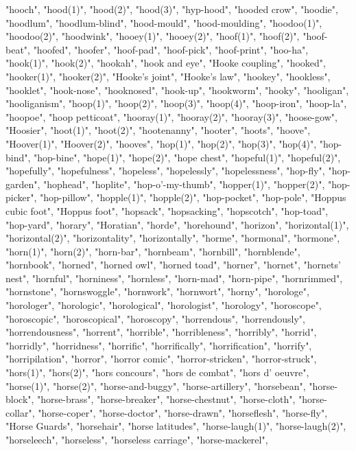 "hooch",
"hood(1)",
"hood(2)",
"hood(3)",
"hyp-hood",
"hooded crow",
"hoodie",
"hoodlum",
"hoodlum-blind",
"hood-mould",
"hood-moulding",
"hoodoo(1)",
"hoodoo(2)",
"hoodwink",
"hooey(1)",
"hooey(2)",
"hoof(1)",
"hoof(2)",
"hoof-beat",
"hoofed",
"hoofer",
"hoof-pad",
"hoof-pick",
"hoof-print",
"hoo-ha",
"hook(1)",
"hook(2)",
"hookah",
"hook and eye",
"Hooke coupling",
"hooked",
"hooker(1)",
"hooker(2)",
"Hooke's joint",
"Hooke's law",
"hookey",
"hookless",
"hooklet",
"hook-nose",
"hooknosed",
"hook-up",
"hookworm",
"hooky",
"hooligan",
"hooliganism",
"hoop(1)",
"hoop(2)",
"hoop(3)",
"hoop(4)",
"hoop-iron",
"hoop-la",
"hoopoe",
"hoop petticoat",
"hooray(1)",
"hooray(2)",
"hooray(3)",
"hoose-gow",
"Hoosier",
"hoot(1)",
"hoot(2)",
"hootenanny",
"hooter",
"hoots",
"hoove",
"Hoover(1)",
"Hoover(2)",
"hooves",
"hop(1)",
"hop(2)",
"hop(3)",
"hop(4)",
"hop-bind",
"hop-bine",
"hope(1)",
"hope(2)",
"hope chest",
"hopeful(1)",
"hopeful(2)",
"hopefully",
"hopefulness",
"hopeless",
"hopelessly",
"hopelessness",
"hop-fly",
"hop-garden",
"hophead",
"hoplite",
"hop-o'-my-thumb",
"hopper(1)",
"hopper(2)",
"hop-picker",
"hop-pillow",
"hopple(1)",
"hopple(2)",
"hop-pocket",
"hop-pole",
"Hoppus cubic foot",
"Hoppus foot",
"hopsack",
"hopsacking",
"hopscotch",
"hop-toad",
"hop-yard",
"horary",
"Horatian",
"horde",
"horehound",
"horizon",
"horizontal(1)",
"horizontal(2)",
"horizontality",
"horizontally",
"horme",
"hormonal",
"hormone",
"horn(1)",
"horn(2)",
"horn-bar",
"hornbeam",
"hornbill",
"hornblende",
"hornbook",
"horned",
"horned owl",
"horned toad",
"horner",
"hornet",
"hornets' nest",
"hornful",
"horniness",
"hornless",
"horn-mad",
"horn-pipe",
"hornrimmed",
"hornstone",
"hornswoggle",
"hornwork",
"hornwort",
"horny",
"horologe",
"horologer",
"horologic",
"horological",
"horologist",
"horology",
"horoscope",
"horoscopic",
"horoscopical",
"horoscopy",
"horrendous",
"horrendously",
"horrendousness",
"horrent",
"horrible",
"horribleness",
"horribly",
"horrid",
"horridly",
"horridness",
"horrific",
"horrifically",
"horrification",
"horrify",
"horripilation",
"horror",
"horror comic",
"horror-stricken",
"horror-struck",
"hors(1)",
"hors(2)",
"hors concours",
"hors de combat",
"hors d' oeuvre",
"horse(1)",
"horse(2)",
"horse-and-buggy",
"horse-artillery",
"horsebean",
"horse-block",
"horse-brass",
"horse-breaker",
"horse-chestnut",
"horse-cloth",
"horse-collar",
"horse-coper",
"horse-doctor",
"horse-drawn",
"horseflesh",
"horse-fly",
"Horse Guards",
"horsehair",
"horse latitudes",
"horse-laugh(1)",
"horse-laugh(2)",
"horseleech",
"horseless",
"horseless carriage",
"horse-mackerel",
